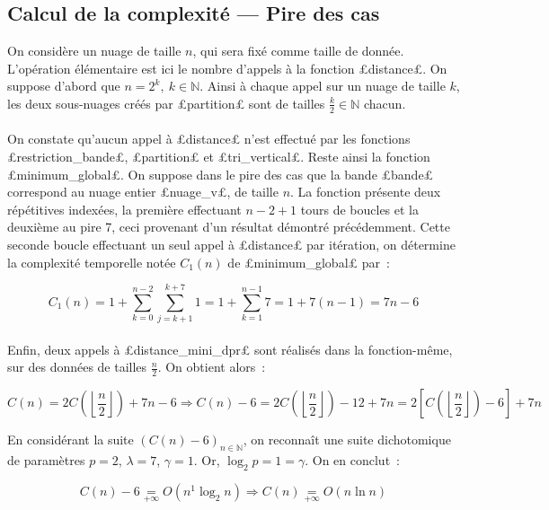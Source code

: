 \documentclass{article}
\renewcommand{\O}[1]{O\!\left(#1\right)}
\newcommand{\ent}[1]{\left\lfloor #1\right\rfloor}
\begin{document}
  \subsection{Calcul de la complexité --- Pire des cas}

  On considère un nuage de taille $n$, qui sera fixé comme taille de donnée. L'opération élémentaire est ici le nombre d'appels à la fonction £distance£. On suppose d'abord que $n = 2^k,\ k\in\mathbb{N}$. Ainsi à chaque appel sur un nuage de taille $k$, les deux sous-nuages créés par £partition£ sont de tailles $\frac{k}{2}\in\mathbb{N}$ chacun.

  \paragraph{} On constate qu'aucun appel à £distance£ n'est effectué par les fonctions £restriction_bande£, £partition£ et £tri_vertical£. Reste ainsi la fonction £minimum_global£. On suppose dans le pire des cas que la bande £bande£ correspond au nuage entier £nuage_v£, de taille $n$. La fonction présente deux répétitives indexées, la première effectuant $n - 2 + 1$ tours de boucles et la deuxième au pire 7, ceci provenant d'un résultat démontré précédemment. Cette seconde boucle effectuant un seul appel à £distance£ par itération, on détermine la complexité temporelle notée $C_1(n)$ de £minimum_global£ par~:

  \[
    C_1(n) = 1 + \sum_{k=0}^{n-2} \sum_{j=k+1}^{k+7} 1 = 1 + \sum_{k=1}^{n-1} 7 = 1 + 7(n-1) = 7n - 6
  \]

  \paragraph{} Enfin, deux appels à £distance_mini_dpr£ sont réalisés dans la fonction-même, sur des données de tailles $\frac{n}{2}$. On obtient alors~:

  \[
    C(n) = 2C\left(\ent{\frac{n}{2}}\right) + 7n - 6 \Longrightarrow C(n) -6 = 2C\left(\ent{\frac{n}{2}}\right) - 12 + 7n = 2\left[C\left(\ent{\frac{n}{2}}\right) - 6\right] + 7n
  \]

  En considérant la suite $\left(C(n) - 6\right)_{n\in\mathbb{N}}$, on reconnaît une suite dichotomique de paramètres $p = 2$, $\lambda = 7$, $\gamma = 1$. Or, $\log_2 p = 1 = \gamma$. On en conclut~:

  \[
    C(n) - 6 \underset{+\infty}{=} \O{n^1\log_2 n} \Longrightarrow C(n) \underset{+\infty}{=} \O{n\ln n}
  \]
\end{document}
